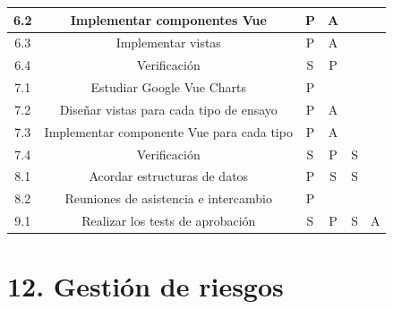 \documentclass[11pt]{charter}
\begin{document}
\begin{table}[htpb]
{\begin{tabular}{|c|c|c|c|c|c|}
6.2 & Implementar componentes Vue & P & A &  &  \\ \hline
6.3 & Implementar vistas & P & A &  &  \\ \hline
6.4 & Verificación & S & P &  &  \\ \hline
7.1 & Estudiar Google Vue Charts & P &  &  &  \\ \hline
7.2 & Diseñar vistas para cada tipo de ensayo & P & A &  &  \\ \hline
7.3 & Implementar componente Vue para cada tipo & P & A &  &  \\ \hline
7.4 & Verificación & S & P & S &  \\ \hline
8.1 & Acordar estructuras de datos & P & S & S &  \\ \hline
8.2 & Reuniones de asistencia e intercambio & P &  &  &  \\ \hline
9.1 & Realizar los tests de aprobación & S & P & S & A \\ \hline
\end{tabular}%
}
\end{table}


\section{12. Gestión de riesgos}
\label{sec:riesgos}

\end{document}
